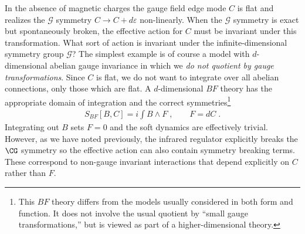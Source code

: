 \documentclass[11pt]{article}
\begin{document}
In the absence of magnetic charges the gauge field edge mode  $C$ is flat and realizes the $\mathcal{G}$ symmetry $C \to C + d\varepsilon$ non-linearly.  When the $\mathcal{G}$ symmetry is exact but spontaneously broken, the effective action for $C$ must be invariant under this transformation.  What sort of action is invariant under the infinite-dimensional symmetry group $\mathcal{G}$? The simplest example is of course a model with $d$-dimensional abelian gauge invariance in which we \textit{do not quotient by gauge transformations}. 
Since $C$ is flat, we do not want to integrate over all abelian connections, only those which are flat. A $d$-dimensional $BF$ theory has the appropriate domain of integration and the correct symmetries\footnote{This $BF$ theory differs from the models usually considered in both form and function. It does not involve the usual quotient by ``small gauge transformations,'' but is viewed as part of a higher-dimensional theory.}
\begin{equation}
\begin{split}
\label{eq:BF}
S_{BF}[B,C] =i \int  B\wedge F \; , \qquad F = d C \; . 
\end{split}
\end{equation}
Integrating out $B$ sets $F=0$ and the soft dynamics are effectively trivial. However, as we have noted previously, the infrared regulator explicitly breaks the $\CG$ symmetry so the effective action can also contain symmetry breaking terms. These correspond to non-gauge invariant interactions that depend explicitly on $C$ rather than $F$. 
\end{document}
